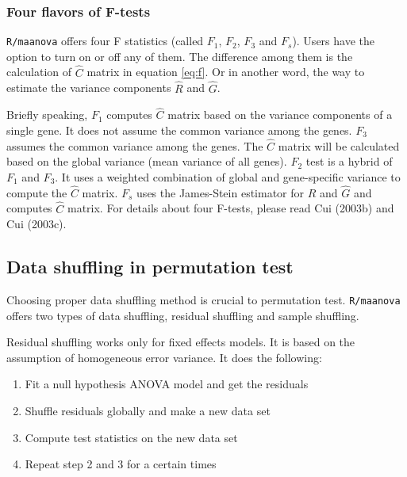 \subsubsection{Four flavors of F-tests}
{\tt R/maanova} offers four F statistics 
(called $F_1$, $F_2$, $F_3$ and $F_s$). Users have the option to 
turn on or off any of them. The difference among them
is the calculation of $\hat{C}$ matrix in equation \ref{eq:f}.
Or in another word, the way to estimate the variance components
$\hat{R}$ and $\hat{G}$.

Briefly speaking, 
$F_1$ computes $\hat{C}$ matrix based on the variance components
of a single gene. It does not assume the common variance 
among the genes. $F_3$ assumes the common variance among the genes. 
The $\hat{C}$ matrix will be calculated based on the 
global variance (mean variance of all genes). 
$F_2$ test is a hybrid of $F_1$ and $F_3$. It uses 
a weighted combination of global and gene-specific variance 
to compute the $\hat{C}$ matrix. $F_s$ uses the James-Stein
estimator for $\hat{R}$ and $\hat{G}$ and computes $\hat{C}$ 
matrix. For details about four F-tests, please read Cui (2003b)
and Cui (2003c).

\subsection{Data shuffling in permutation test}
Choosing proper data shuffling method is crucial
to permutation test. {\tt R/maanova} offers two types
of data shuffling, residual shuffling and sample 
shuffling. 

Residual shuffling works only for fixed effects models. 
It is based on the assumption of homogeneous error variance. 
It does the following:
\begin{enumerate}
\item Fit a null hypothesis ANOVA model and get the residuals
\item Shuffle residuals globally and make a new data set
\item Compute test statistics on the new data set
\item Repeat step 2 and 3 for a certain times
\end{enumerate}

